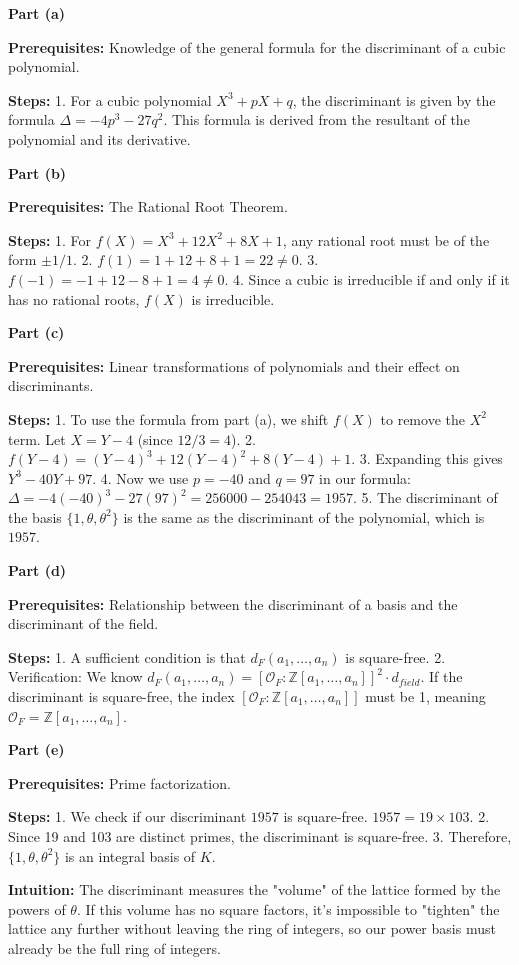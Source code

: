 \begin{solution}
\textbf{Part (a)}

\medskip
\textbf{Prerequisites:}
Knowledge of the general formula for the discriminant of a cubic polynomial.

\medskip
\textbf{Steps:}
1. For a cubic polynomial $X^3 + pX + q$, the discriminant is given by the formula $\Delta = -4p^3 - 27q^2$. This formula is derived from the resultant of the polynomial and its derivative.

\bigskip
\textbf{Part (b)}

\medskip
\textbf{Prerequisites:}
The Rational Root Theorem.

\medskip
\textbf{Steps:}
1. For $f(X) = X^3 + 12X^2 + 8X + 1$, any rational root must be of the form $\pm 1/1$.
2. $f(1) = 1 + 12 + 8 + 1 = 22 \neq 0$.
3. $f(-1) = -1 + 12 - 8 + 1 = 4 \neq 0$.
4. Since a cubic is irreducible if and only if it has no rational roots, $f(X)$ is irreducible.

\bigskip
\textbf{Part (c)}

\medskip
\textbf{Prerequisites:}
Linear transformations of polynomials and their effect on discriminants.

\medskip
\textbf{Steps:}
1. To use the formula from part (a), we shift $f(X)$ to remove the $X^2$ term. Let $X = Y - 4$ (since $12/3 = 4$).
2. $f(Y-4) = (Y-4)^3 + 12(Y-4)^2 + 8(Y-4) + 1$.
3. Expanding this gives $Y^3 - 40Y + 97$.
4. Now we use $p = -40$ and $q = 97$ in our formula:
$\Delta = -4(-40)^3 - 27(97)^2 = 256000 - 254043 = 1957$.
5. The discriminant of the basis $\{1, \theta, \theta^2\}$ is the same as the discriminant of the polynomial, which is $1957$.

\bigskip
\textbf{Part (d)}

\medskip
\textbf{Prerequisites:}
Relationship between the discriminant of a basis and the discriminant of the field.

\medskip
\textbf{Steps:}
1. A sufficient condition is that $d_F(a_1, \dots, a_n)$ is square-free.
2. Verification: We know $d_F(a_1, \dots, a_n) = [\mathcal{O}_F : \mathbb{Z}[a_1, \dots, a_n]]^2 \cdot d_{field}$. If the discriminant is square-free, the index $[\mathcal{O}_F : \mathbb{Z}[a_1, \dots, a_n]]$ must be 1, meaning $\mathcal{O}_F = \mathbb{Z}[a_1, \dots, a_n]$.

\bigskip
\textbf{Part (e)}

\medskip
\textbf{Prerequisites:}
Prime factorization.

\medskip
\textbf{Steps:}
1. We check if our discriminant $1957$ is square-free. $1957 = 19 \times 103$.
2. Since 19 and 103 are distinct primes, the discriminant is square-free.
3. Therefore, $\{1, \theta, \theta^2\}$ is an integral basis of $K$.

\medskip
\textbf{Intuition:}
The discriminant measures the "volume" of the lattice formed by the powers of $\theta$. If this volume has no square factors, it's impossible to "tighten" the lattice any further without leaving the ring of integers, so our power basis must already be the full ring of integers.
\end{solution}
